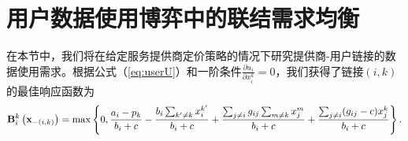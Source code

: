 \section{用户数据使用博弈中的联结需求均衡}\label{sec:stageII}

在本节中，我们将在给定服务提供商定价策略的情况下研究提供商-用户链接的数据使用需求。根据公式（\ref{eq:userU}）和一阶条件$\frac{\partial u_{i}}{\partial x^{k}_{i}} = 0$，我们获得了链接$(i,k)$的最佳响应函数为
\begin{equation}\label{br1}
\bold{B}^{k}_{i}\left(\mathbf{x}_{-(i,k)}\right)=\max\left\{0,\frac{a_i-p_k}{b_i+c}-\frac{b_i\sum_{k'\neq k}x^{k'}_i}{b_i+c} + \frac{\sum_{j\neq i}g_{ij}\sum_{m\neq k}x_{j}^{m}}{b_i+c}+\frac{\sum_{j\neq i}(g_{ij}-c)x_{j}^{k}}{b_i+c}\right\}.
\end{equation}



